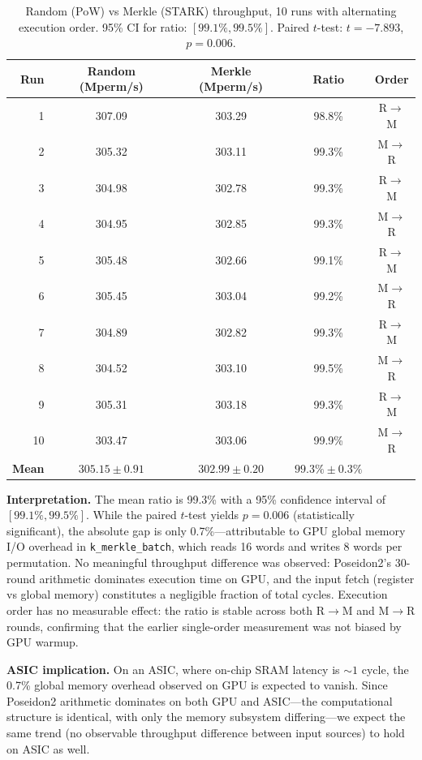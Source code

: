 \documentclass[11pt,a4paper]{article}
\begin{document}
\begin{table}[h]
\centering
\begin{tabular}{@{}rcccc@{}}
\toprule
Run & Random (Mperm/s) & Merkle (Mperm/s) & Ratio & Order \\
\midrule
1  & 307.09 & 303.29 & 98.8\% & R$\to$M \\
2  & 305.32 & 303.11 & 99.3\% & M$\to$R \\
3  & 304.98 & 302.78 & 99.3\% & R$\to$M \\
4  & 304.95 & 302.85 & 99.3\% & M$\to$R \\
5  & 305.48 & 302.66 & 99.1\% & R$\to$M \\
6  & 305.45 & 303.04 & 99.2\% & M$\to$R \\
7  & 304.89 & 302.82 & 99.3\% & R$\to$M \\
8  & 304.52 & 303.10 & 99.5\% & M$\to$R \\
9  & 305.31 & 303.18 & 99.3\% & R$\to$M \\
10 & 303.47 & 303.06 & 99.9\% & M$\to$R \\
\midrule
\textbf{Mean} & $\mathbf{305.15 \pm 0.91}$ & $\mathbf{302.99 \pm 0.20}$ & $\mathbf{99.3\% \pm 0.3\%}$ & \\
\bottomrule
\end{tabular}
\caption{Random (PoW) vs Merkle (STARK) throughput, 10 runs with alternating execution order. 95\% CI for ratio: $[99.1\%, 99.5\%]$. Paired $t$-test: $t = -7.893$, $p = 0.006$.}
\label{tab:invariance}
\end{table}

\textbf{Interpretation.}
The mean ratio is 99.3\% with a 95\% confidence interval of $[99.1\%, 99.5\%]$.
While the paired $t$-test yields $p = 0.006$ (statistically significant), the absolute gap is only 0.7\%---attributable to GPU global memory I/O overhead in \texttt{k\_merkle\_batch}, which reads 16 words and writes 8 words per permutation.
No meaningful throughput difference was observed: Poseidon2's 30-round arithmetic dominates execution time on GPU, and the input fetch (register vs global memory) constitutes a negligible fraction of total cycles.
Execution order has no measurable effect: the ratio is stable across both R$\to$M and M$\to$R rounds, confirming that the earlier single-order measurement was not biased by GPU warmup.

\textbf{ASIC implication.}
On an ASIC, where on-chip SRAM latency is ${\sim}1$ cycle, the 0.7\% global memory overhead observed on GPU is expected to vanish.
Since Poseidon2 arithmetic dominates on both GPU and ASIC---the computational structure is identical, with only the memory subsystem differing---we expect the same trend (no observable throughput difference between input sources) to hold on ASIC as well.
\end{document}

